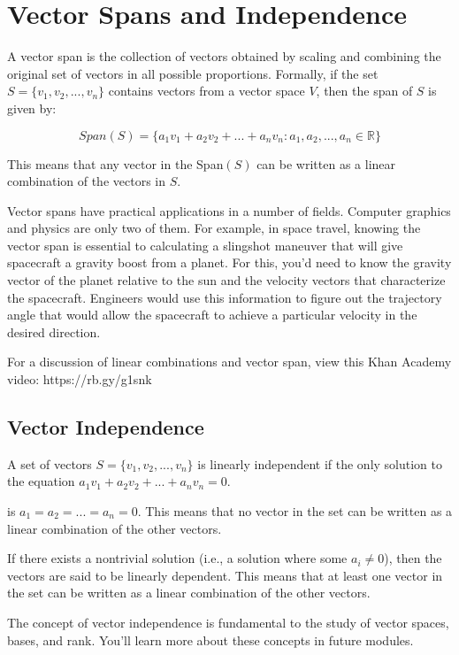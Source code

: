 \chapter{Vector Spans and Independence}

A vector span is the collection of vectors obtained by scaling and combining the original set of vectors in all possible proportions.  Formally, if the set $S = \{v_1, v_2, ..., v_n\}$ contains vectors from a vector space $V$, then the span of $S$ is given by:

\begin{equation}
{Span}(S) = \{a_1v_1 + a_2v_2 + ... + a_nv_n : a_1, a_2, ..., a_n \in \mathbb{R}\}
\end{equation}

This means that any vector in the Span$(S)$ can be written as a linear combination of the vectors in $S$.

Vector spans have practical applications in a number of fields. Computer graphics and physics are only two of them. For example, in space travel, knowing the vector span is essential to calculating a slingshot maneuver that will give spacecraft a gravity boost from a planet. For this, you'd need to know the gravity vector of the planet relative to the sun and the velocity vectors that characterize the spacecraft. Engineers would use this information to figure out the trajectory angle that would allow the spacecraft to achieve a particular velocity in the desired direction. 

For a discussion of linear combinations and vector span, view this Khan Academy video: https://rb.gy/g1snk

\section{Vector Independence}

A set of vectors $S = \{v_1, v_2, ..., v_n\}$ is  linearly independent if the only solution to the equation $a_1v_1 + a_2v_2 + ... + a_nv_n = 0$.

is $a_1 = a_2 = ... = a_n = 0$. This means that no vector in the set can be written as a linear combination of the other vectors.

If there exists a nontrivial solution (i.e., a solution where some $a_i \neq 0$), then the vectors are said to be linearly dependent. This means that at least one vector in the set can be written as a linear combination of the other vectors.

The concept of vector independence is fundamental to the study of vector spaces, bases, and rank. You'll learn more about these concepts in future modules. 

